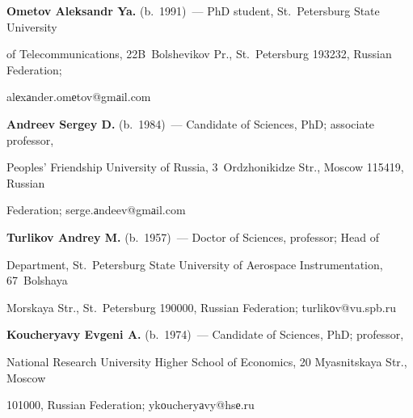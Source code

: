 \Contr





\noindent


\textbf{Ometov Aleksandr Ya.} (b.\ 1991)~--- PhD student, St.\ Petersburg State University 


of Telecommunications, 22B~Bolshevikov Pr., St.\ Petersburg 193232, Russian Federation; 


\mbox{alеxаnder.omеtov@gmаil.com}





\vspace*{4pt}





\noindent


\textbf{Andreev Sergey D.} (b.\ 1984)~--- Candidate of Sciences, PhD; associate professor, 


Peoples' Friendship University of Russia, 3~Ordzhonikidze Str., Moscow 115419, Russian 


Federation; \mbox{serge.аndeev@gmаil.com}





\vspace*{4pt}





\noindent


\textbf{Turlikov Andrey M.} (b.\ 1957)~--- Doctor of Sciences, professor; Head of 


Department, St.\ Petersburg State University of Aerospace Instrumentation, 67~Bolshaya 


Morskaya Str., St.\ Petersburg 190000, Russian Federation; \mbox{turlikоv@vu.spb.ru}





\vspace*{4pt}





\noindent


\textbf{Koucheryavy Evgeni A.} (b.\ 1974)~--- Candidate of Sciences, PhD; professor, 


National Research University Higher School of Economics, 20 Myasnitskaya Str., Moscow 


101000, Russian Federation; \mbox{ykоucheryаvy@hsе.ru}





\label{end\stat}








\renewcommand{\bibname}{\protect\rm Литература}


     



